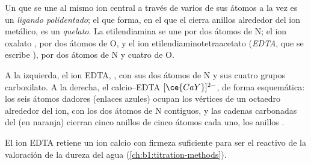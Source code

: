 \begin{definition}\label{def:b1:complexation:chelate}
Un  que se une al mismo ion central a través de varios de sus
átomos a la vez es un \emph{ligando polidentado};
el  que forma, en el que el  cierra anillos alrededor del
ion metálico, es un \emph{quelato}. La etilendiamina
 se une por dos átomos de N; el ion oxalato
, por dos átomos de O, y el ion etilendiaminotetraacetato
(\emph{EDTA}, que se escribe ), por dos átomos de N y cuatro de
O.
\end{definition}

\begin{omfigure}
\hspace{2.2em}

{\small A la izquierda, el ion EDTA, , con sus dos átomos de N y
sus cuatro grupos carboxilato. A la derecha, el  calcio--EDTA
$[\ce{CaY}]^{2-}$, de forma esquemática: los seis átomos dadores (enlaces
azules) ocupan los vértices de un octaedro alrededor del ion, con los dos
átomos de N contiguos, y las cadenas carbonadas del  (en naranja)
cierran cinco anillos de cinco átomos cada uno, los anillos .}
\end{omfigure}

El ion EDTA retiene un ion calcio con firmeza suficiente para ser el
reactivo de la valoración de la dureza del agua
(\cref{ch:b1:titration-methods}).

